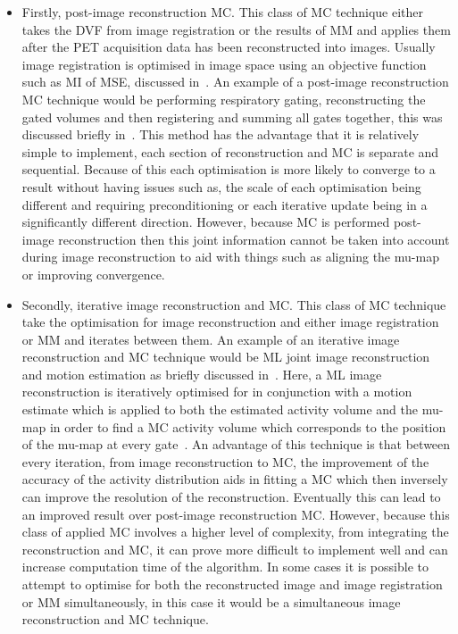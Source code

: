             \begin{itemize}
                \item Firstly, post-image reconstruction \gls{MC}. This class of \gls{MC} technique either takes the \gls{DVF} from image registration or the results of \gls{MM} and applies them after the \gls{PET} acquisition data has been reconstructed into images. Usually image registration is optimised in image space using an objective function such as \gls{MI} of \gls{MSE}, discussed in~. An example of a post-image reconstruction \gls{MC} technique would be performing respiratory gating, reconstructing the gated volumes and then registering and summing all gates together, this was discussed briefly in~. This method has the advantage that it is relatively simple to implement, each section of reconstruction and \gls{MC} is separate and sequential. Because of this each optimisation is more likely to converge to a result without having issues such as, the scale of each optimisation being different and requiring preconditioning or each iterative update being in a significantly different direction. However, because \gls{MC} is performed post-image reconstruction then this joint information cannot be taken into account during image reconstruction to aid with things such as aligning the \gls{mu-map} or improving convergence.
                
                \item Secondly, iterative image reconstruction and \gls{MC}. This class of \gls{MC} technique take the optimisation for image reconstruction and either image registration or \gls{MM} and iterates between them. An example of an iterative image reconstruction and \gls{MC} technique would be \gls{ML} joint image reconstruction and motion estimation as briefly discussed in~. Here, a \gls{ML} image reconstruction is iteratively optimised for in conjunction with a motion estimate which is applied to both the estimated activity volume and the \gls{mu-map} in order to find a \gls{MC} activity volume which corresponds to the position of the \gls{mu-map} at every gate~. An advantage of this technique is that between every iteration, from image reconstruction to \gls{MC}, the improvement of the accuracy of the activity distribution aids in fitting a \gls{MC} which then inversely can improve the resolution of the reconstruction. Eventually this can lead to an improved result over post-image reconstruction \gls{MC}. However, because this class of applied \gls{MC} involves a higher level of complexity, from integrating the reconstruction and \gls{MC}, it can prove more difficult to implement well and can increase computation time of the algorithm. In some cases it is possible to attempt to optimise for both the reconstructed image and image registration or \gls{MM} simultaneously, in this case it would be a simultaneous image reconstruction and \gls{MC} technique.
            \end{itemize}
    
